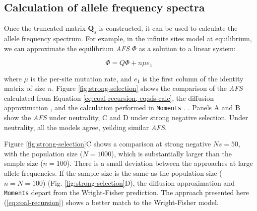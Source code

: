 \documentclass[review]{elsarticle}
\newcommand{\sgcomment}[1]{{\color{red}{SG: #1}}}
\newcommand{\ikcomment}[1]{{\color{blue}{IK: #1}}}
\begin{document}

\subsection{Calculation of allele frequency spectra}
\label{subsec:afs}

Once the truncated matrix $\mathbf{Q}_s$ is constructed, it can be used to calculate the allele
frequency spectrum. For example, in the infinite sites model at equilibrium, we can approximate the
equilibrium \textit{AFS} $\Phi$ as a solution to a linear system:

\begin{equation}
  \label{eq:sfs-calc}
  \Phi = Q \Phi  + n \mu e_1
\end{equation}

where $\mu$ is the per-site mutation rate, and $e_1$ is the first column of the identity matrix of
size $n$. Figure \ref{fig:strong-selection} shows the comparison of the \textit{AFS} calculated from
Equation \eqref{eq:coal-recursion, eq:sfs-calc}, the diffusion approximation \cite[eq.
9.23]{Ewens2004}, and the calculation performed in \texttt{Moments} \citep{JouganousEtAl2017}.
\sgcomment{Should we give an example for very large sample sizes on panels A and B to show the
  finite sample effect?} \ikcomment{Is $n=100, N=100$ good here?}. Panels A and B show the
\textit{AFS} under neutrality, C and D under strong negative selection. Under neutrality, all the
models agree, yeilding similar \textit{AFS}.

Figure \ref{fig:strong-selection}C shows a comparison at strong negative $Ns=50$, with the
population size ($N=1000$), which is substantially larger than the sample size ($n=100$). There is a
small deviation between the approaches at large allele frequencies. If the sample size is the same
as the population size ($n=N=100$) (Fig. \ref{fig:strong-selection}D), the diffusion approximation
and \texttt{Moments} depart from the Wright-Fisher prediction. The approach presented here
(\ref{eq:coal-recursion}) shows a better match to the Wright-Fisher model.
\end{document}
